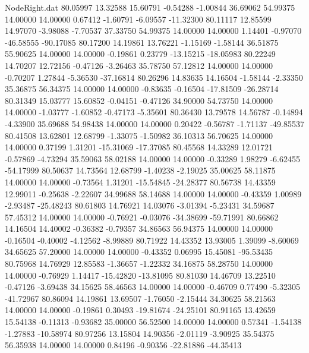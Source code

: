 \begin{filecontents}{NodeRight.dat}
  80.05997   13.32588   15.60791    -0.54288   -1.00844   36.69062   54.99375   14.00000   14.00000    0.67412   -1.60791   -6.09557  -11.32300
  80.11117   12.85599   14.97070    -3.98088   -7.70537   37.33750   54.99375   14.00000   14.00000    1.14401   -0.97070  -46.58555  -90.17085
  80.17200   14.19861   13.76221    -1.15169   -1.58144   36.51875   55.90625   14.00000   14.00000   -0.19861    0.23779  -13.15215  -18.05983
  80.22249   14.70207   12.72156    -0.47126   -3.26463   35.78750   57.12812   14.00000   14.00000   -0.70207    1.27844   -5.36530  -37.16814
  80.26296   14.83635   14.16504    -1.58144   -2.33350   35.36875   56.34375   14.00000   14.00000   -0.83635   -0.16504  -17.81509  -26.28714
  80.31349   15.03777   15.60852    -0.04151   -0.47126   34.90000   54.73750   14.00000   14.00000   -1.03777   -1.60852   -0.47173   -5.35601
  80.36430   13.79578   14.56787    -0.14894   -4.33900   35.69688   54.98438   14.00000   14.00000    0.20422   -0.56787   -1.71137  -49.85537
  80.41508   13.62801   12.68799    -1.33075   -1.50982   36.10313   56.70625   14.00000   14.00000    0.37199    1.31201  -15.31069  -17.37085
  80.45568   14.33289   12.01721    -0.57869   -4.73294   35.59063   58.02188   14.00000   14.00000   -0.33289    1.98279   -6.62455  -54.17999
  80.50637   14.73564   12.68799    -1.40238   -2.19025   35.00625   58.11875   14.00000   14.00000   -0.73564    1.31201  -15.54845  -24.28377
  80.56738   14.43359   12.99011    -0.25638   -2.22607   34.99688   58.14688   14.00000   14.00000   -0.43359    1.00989   -2.93487  -25.48243
  80.61803   14.76921   14.03076    -3.01394   -5.23431   34.59687   57.45312   14.00000   14.00000   -0.76921   -0.03076  -34.38699  -59.71991
  80.66862   14.16504   14.40002    -0.36382   -0.79357   34.86563   56.94375   14.00000   14.00000   -0.16504   -0.40002   -4.12562   -8.99889
  80.71922   14.43352   13.93005     1.39099   -8.60069   34.65625   57.20000   14.00000   14.00000   -0.43352    0.06995   15.45081  -95.53435
  80.75968   14.76929   12.85583    -1.36657   -1.22332   34.16875   58.28750   14.00000   14.00000   -0.76929    1.14417  -15.42820  -13.81095
  80.81030   14.46709   13.22510    -0.47126   -3.69438   34.15625   58.46563   14.00000   14.00000   -0.46709    0.77490   -5.32305  -41.72967
  80.86094   14.19861   13.69507    -1.76050   -2.15444   34.30625   58.21563   14.00000   14.00000   -0.19861    0.30493  -19.81674  -24.25101
  80.91165   13.42659   15.54138    -0.11313   -0.93682   35.00000   56.52500   14.00000   14.00000    0.57341   -1.54138   -1.27883  -10.58974
  80.97256   13.15804   14.90356    -2.01119   -3.90925   35.54375   56.35938   14.00000   14.00000    0.84196   -0.90356  -22.81886  -44.35413

\end{filecontents}
